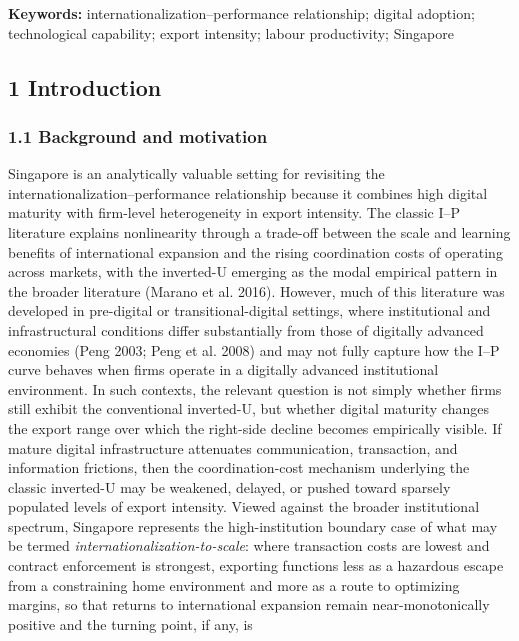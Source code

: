 \documentclass[12pt,a4paper]{article}
\begin{document}
\textbf{Keywords:} internationalization--performance relationship;
digital adoption; technological capability; export intensity; labour
productivity; Singapore

\hypertarget{1-introduction}{%
\subsection{1 Introduction}\label{1-introduction}}

\hypertarget{11-background-and-motivation}{%
\subsubsection{1.1 Background and
motivation}\label{11-background-and-motivation}}

Singapore is an analytically valuable setting for revisiting the
internationalization--performance relationship because it combines high
digital maturity with firm-level heterogeneity in export intensity. The
classic I--P literature explains nonlinearity through a trade-off
between the scale and learning benefits of international expansion and
the rising coordination costs of operating across markets, with the
inverted-U emerging as the modal empirical pattern in the broader
literature (Marano et al. 2016). However, much of this literature was
developed in pre-digital or transitional-digital settings, where
institutional and infrastructural conditions differ substantially from
those of digitally advanced economies (Peng 2003; Peng et al. 2008) and
may not fully capture how the I--P curve behaves when firms operate in a
digitally advanced institutional environment. In such contexts, the
relevant question is not simply whether firms still exhibit the
conventional inverted-U, but whether digital maturity changes the export
range over which the right-side decline becomes empirically visible. If
mature digital infrastructure attenuates communication, transaction, and
information frictions, then the coordination-cost mechanism underlying
the classic inverted-U may be weakened, delayed, or pushed toward
sparsely populated levels of export intensity. Viewed against the
broader institutional spectrum, Singapore represents the
high-institution boundary case of what may be termed
\emph{internationalization-to-scale}: where transaction costs are lowest
and contract enforcement is strongest, exporting functions less as a
hazardous escape from a constraining home environment and more as a
route to optimizing margins, so that returns to international expansion
remain near-monotonically positive and the turning point, if any, is
\end{document}
